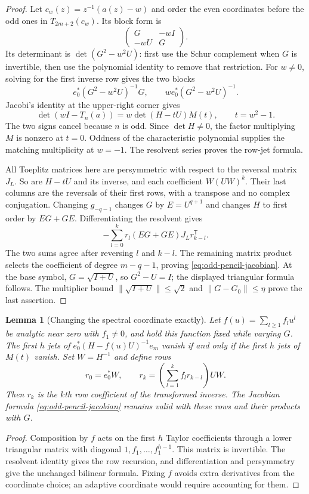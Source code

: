 \documentclass[11pt]{article}
\newtheorem{lemma}[proposition]{Lemma}
\begin{document}
\begin{proof}
Let $c_w(z)=z^{-1}(a(z)-w)$ and order the even coordinates before
the odd ones in $T_{2m+2}(c_w)$. Its block form is
\[
 \begin{pmatrix}G&-wI\\-wU&G\end{pmatrix}.
\]
Its determinant is $\det(G^2-w^2U)$: first use the Schur complement
when $G$ is invertible, then use the polynomial identity to remove
that restriction. For $w\ne0$, solving for the first inverse row gives
the two blocks
\[
 e_0^*(G^2-w^2U)^{-1}G,
 \qquad we_0^*(G^2-w^2U)^{-1}.
\]
Jacobi's identity at the upper-right corner gives
\[
 \det(wI-T_n(a))
 =w\det(H-tU)M(t),\qquad t=w^2-1.
\]
The two signs cancel because $n$ is odd. Since $\det H\ne0$,
the factor multiplying $M$ is nonzero at $t=0$. Oddness of the
characteristic polynomial supplies the matching multiplicity at $w=-1$.
The resolvent series proves the row-jet formula.

All Toeplitz matrices here are persymmetric with respect to the reversal
matrix $J_L$. So are $H-tU$ and its inverse, and each coefficient
$W(UW)^k$. Their last columns are the reversals of their first rows,
with a transpose and no complex conjugation. Changing $g_{-q-1}$ changes
$G$ by $E=U^{q+1}$ and changes $H$ to first order by $EG+GE$.
Differentiating the resolvent gives
\[
 -\sum_{l=0}^k r_l(EG+GE)J_Lr_{k-l}^{\mathsf T}.
\]
The two sums agree after reversing $l$ and $k-l$. The remaining matrix
product selects the coefficient of degree $m-q-1$, proving
\eqref{eq:odd-pencil-jacobian}. At the base symbol,
$G=\sqrt{I+U}$, so $G^2-U=I$; the displayed triangular formula follows.
The multiplier bound $\|\sqrt{I+U}\|\le\sqrt2$ and
$\|G-G_0\|\le\eta$ prove the last assertion.
\end{proof}


\begin{lemma}[Changing the spectral coordinate exactly]
\label{lem:coordinate-jets}
Let $f(u)=\sum_{l\ge1}f_lu^l$ be analytic near zero with $f_1\ne0$,
and hold this function fixed while varying $G$.
The first $h$ jets of
$e_0^*(H-f(u)U)^{-1}e_m$ vanish if and only if the first $h$ jets
of $M(t)$ vanish. Set $W=H^{-1}$ and define rows
\[
 r_0=e_0^*W,\qquad
 r_k=\left(\sum_{l=1}^k f_l r_{k-l}\right)UW.
\]
Then $r_k$ is the $k$th row coefficient of the transformed inverse.
The Jacobian formula \eqref{eq:odd-pencil-jacobian} remains valid with
these rows and their products with $G$.
\end{lemma}
\begin{proof}
Composition by $f$ acts on the first $h$ Taylor coefficients through
a lower triangular matrix with diagonal $1,f_1,\ldots,f_1^{h-1}$.
This matrix is invertible. The resolvent identity gives the row
recursion, and differentiation and persymmetry give the unchanged
bilinear formula. Fixing $f$ avoids extra derivatives from the coordinate
choice; an adaptive coordinate would require accounting for them.
\end{proof}
\end{document}
